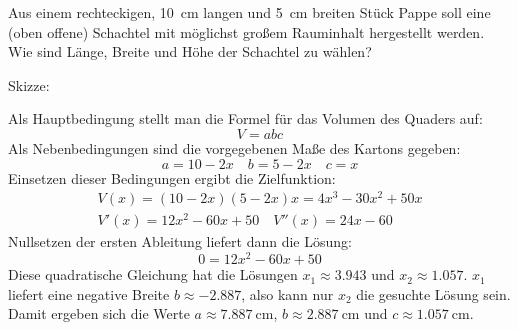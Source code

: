 \documentclass[auto-toc=false,babel=ngerman]{arbeitsblatt}
\begin{document}
\begin{question}
  Aus einem rechteckigen, \SI{10}{\centi\metre} langen und
  \SI{5}{\centi\metre} breiten Stück Pappe soll eine (oben offene) Schachtel
  mit möglichst großem Rauminhalt hergestellt werden.  Wie sind Länge, Breite
  und Höhe der Schachtel zu wählen?
\end{question}

\begin{solution}
  Skizze:
  \begin{center}
  \end{center}
  Als Hauptbedingung stellt man die Formel für das Volumen des Quaders auf:
  \[ V = abc \]
  Als Nebenbedingungen sind die vorgegebenen Maße des Kartons gegeben:
  \[  a = 10-2x \quad  b = 5-2x \quad c = x \]
  Einsetzen dieser Bedingungen ergibt die Zielfunktion:
  \begin{gather*}
    V(x)   = (10-2x)(5-2x)x = 4x^3 - 30x^2 + 50x \\
    V'(x)  = 12x^2-60x + 50 \quad
    V''(x) = 24x-60
  \end{gather*}
  Nullsetzen der ersten Ableitung liefert dann die Lösung:
  \[ 0 = 12x^2 -60x+50 \] Diese quadratische Gleichung hat die Lösungen $x_1
  \approx \num{3.943}$ und $x_2 \approx \num{1.057}$.  $x_1$ liefert eine
  negative Breite $b \approx \num{-2.887}$, also kann nur $x_2$ die gesuchte
  Lösung sein.  Damit ergeben sich die Werte $a \approx
  \SI{7.887}{\centi\metre}$, $b \approx \SI{2.887}{\centi\metre}$ und $c
  \approx \SI{1.057}{\centi\metre}$.
\end{solution}
\end{document}
